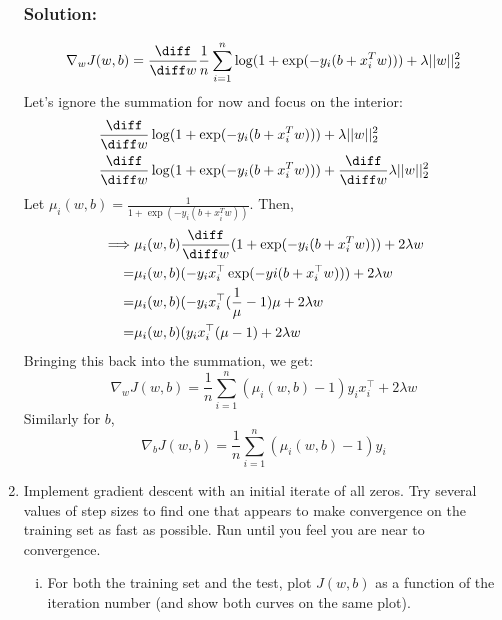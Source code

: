 \documentclass[shortlabels]{article}
\begin{document}
\begin{aprob}
\begin{enumerate}
        \subsubsection*{Solution:} 
        \begin{align*}
            \nabla_w J(w,b) = \frac{\diff}{\diff w} \frac{1}{n} \sum_{i=1}^n \log( 1 + \exp(-y_i (b + x_i^T w))) + \lambda ||w||_2^2
        \end{align*}
        Let's ignore the summation for now and focus on the interior:
        \begin{align*}
            \frac{\diff}{\diff w} & \log( 1 + \exp(-y_i (b + x_i^T w))) + \lambda ||w||_2^2 \\
            \frac{\diff}{\diff w} & \log( 1 + \exp(-y_i (b + x_i^T w))) + \frac{\diff}{\diff w} \lambda ||w||_2^2 \\
        \end{align*}
        Let $\mu_i(w,b) = \frac{1}{1+ \exp(-y_i (b + x_i^T w))}$. Then,
        \begin{align*}
            \implies &\mu_i(w,b) \frac{\diff}{\diff w} ({1+ \exp(-y_i (b + x_i^T w))}) + 2\lambda w\\
            = &\mu_i(w,b) (-y_i x_i^\top \exp(-yi(b + x_i^\top w))) + 2\lambda w\\
            = &\mu_i(w,b) (-y_i x_i^\top (\frac{1}{\mu} - 1) \mu + 2\lambda w\\
            = &\mu_i(w,b) (y_i x_i^\top (\mu - 1)+ 2\lambda w \\
        \end{align*}
        Bringing this back into the summation, we get:
        $$ \boxed{\nabla_w J(w,b) = \frac{1}{n} \sum_{i=1}^n  \left(\mu_i(w,b) - 1\right) y_i x_i^\top + 2\lambda w  } $$
        Similarly for $b$,
        $$ \boxed{\nabla_b J(w,b) = \frac{1}{n} \sum_{i=1}^n  \left(\mu_i(w,b) - 1\right) y_i  } $$
        
        \newpage

        \item {} Implement gradient descent with an initial iterate of all zeros. Try several values of step sizes to find one that appears to make convergence on the training set as fast as possible. Run until you feel you are near to convergence.
        \begin{enumerate}[(i)]
            \item For both the training set and the test, plot $J(w,b)$ as a function of the iteration number (and show both curves on the same plot).  
            

\end{enumerate}
\end{enumerate}
\end{aprob}
\end{document}
